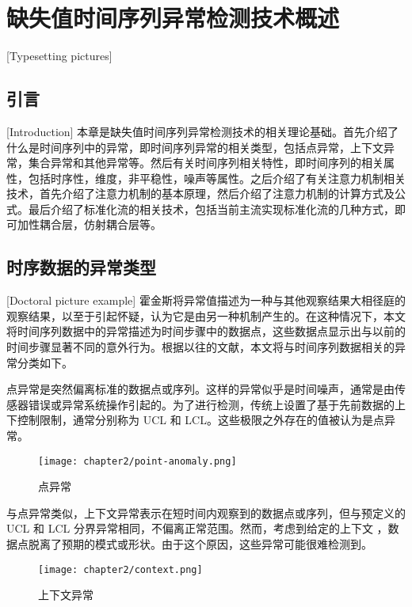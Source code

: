 
\chapter{缺失值时间序列异常检测技术概述}[Typesetting pictures]

\section{引言}[Introduction]
本章是缺失值时间序列异常检测技术的相关理论基础。首先介绍了什么是时间序列中的异常，即时间序列异常的相关类型，包括点异常，上下文异常，集合异常和其他异常等。然后有关时间序列相关特性，即时间序列的相关属性，包括时序性，维度，非平稳性，噪声等属性。之后介绍了有关注意力机制相关技术，首先介绍了注意力机制的基本原理，然后介绍了注意力机制的计算方式及公式。最后介绍了标准化流的相关技术，包括当前主流实现标准化流的几种方式，即可加性耦合层，仿射耦合层等。

\section{时序数据的异常类型}[Doctoral picture example]
霍金斯\cite{hawkings}将异常值描述为一种与其他观察结果大相径庭的观察结果，以至于引起怀疑，认为它是由另一种机制产生的。在这种情况下，本文将时间序列数据中的异常描述为时间步骤中的数据点，这些数据点显示出与以前的时间步骤显著不同的意外行为。根据以往的文献，本文将与时间序列数据相关的异常分类如下。

点异常是突然偏离标准的数据点或序列。这样的异常似乎是时间噪声，通常是由传感器错误或异常系统操作引起的。为了进行检测，传统上设置了基于先前数据的上下控制限制，通常分别称为 UCL 和 LCL。这些极限之外存在的值被认为是点异常。
\begin{figure}[ht]
    \centering
    \texttt{[image: chapter2/point-anomaly.png]}
    \caption{点异常}
    \end{figure}

与点异常类似，上下文异常表示在短时间内观察到的数据点或序列，但与预定义的 UCL 和 LCL 分界异常相同，不偏离正常范围。然而，考虑到给定的上下文 ，数据点脱离了预期的模式或形状。由于这个原因，这些异常可能很难检测到。
\begin{figure}[ht]
    \centering
    \texttt{[image: chapter2/context.png]}
    \caption{上下文异常}
    \end{figure}

